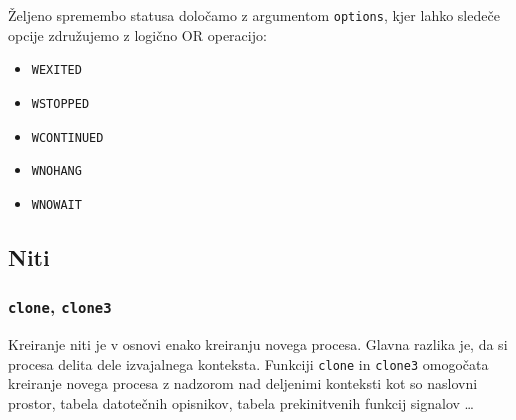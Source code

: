 \documentclass[a4paper,12pt,openright]{book}
\begin{document}
Željeno spremembo statusa določamo z argumentom \texttt{options}, kjer lahko sledeče opcije združujemo z logično OR operacijo:
\begin{itemize}
	\item \texttt{WEXITED}
	\item \texttt{WSTOPPED}
	\item \texttt{WCONTINUED}
	\item \texttt{WNOHANG}
	\item \texttt{WNOWAIT}
\end{itemize}

\subsection{Niti}

\subsubsection{\texttt{clone}, \texttt{clone3}}

Kreiranje niti je v osnovi enako kreiranju novega procesa.
Glavna razlika je, da si procesa delita dele izvajalnega konteksta.
Funkciji \texttt{clone} in \texttt{clone3} omogočata kreiranje novega procesa z nadzorom nad deljenimi konteksti kot so naslovni prostor, tabela datotečnih opisnikov, tabela prekinitvenih funkcij signalov \dots
\end{document}
